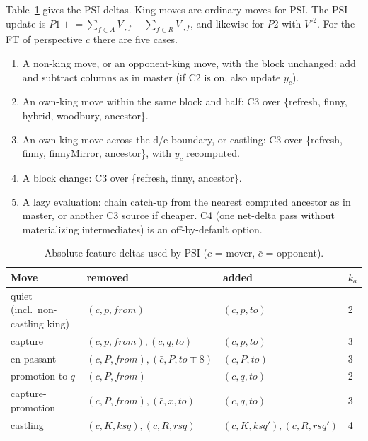 \documentclass[10pt]{article}
\theoremstyle{plain}
\theoremstyle{definition}
\begin{document}
Table~\ref{tab:moves} gives the PSI deltas.
King moves are ordinary moves for PSI.
The PSI update is $P1\mathrel{+}=\sum_{f\in A}V_{\cdot,f}-\sum_{f\in R}V_{\cdot,f}$, and likewise for $P2$ with $V^{\circ2}$.
For the FT of perspective $c$ there are five cases.
\begin{enumerate}[leftmargin=*,itemsep=1pt]
\item A non-king move, or an opponent-king move, with the block unchanged: add and subtract columns as in master (if C2 is on, also update $y_c$).
\item An own-king move within the same block and half: C3 over \{refresh, finny, hybrid, woodbury, ancestor\}.
\item An own-king move across the d/e boundary, or castling: C3 over \{refresh, finny, finnyMirror, ancestor\}, with $y_c$ recomputed.
\item A block change: C3 over \{refresh, finny, ancestor\}.
\item A lazy evaluation: chain catch-up from the nearest computed ancestor as in master, or another C3 source if cheaper. C4 (one net-delta pass without materializing intermediates) is an off-by-default option.
\end{enumerate}

\begin{table}[htbp]
\centering\small
\caption{Absolute-feature deltas used by PSI ($c$ = mover, $\bar c$ = opponent).}\label{tab:moves}
\begin{tabular}{@{}llll@{}}
\toprule
Move & removed & added & $k_a$\\
\midrule
quiet (incl.\ non-castling king) & $(c,p,\mathit{from})$ & $(c,p,\mathit{to})$ & 2\\
capture & $(c,p,\mathit{from}),(\bar c,q,\mathit{to})$ & $(c,p,\mathit{to})$ & 3\\
en passant & $(c,P,\mathit{from}),(\bar c,P,\mathit{to}\mp8)$ & $(c,P,\mathit{to})$ & 3\\
promotion to $q$ & $(c,P,\mathit{from})$ & $(c,q,\mathit{to})$ & 2\\
capture-promotion & $(c,P,\mathit{from}),(\bar c,x,\mathit{to})$ & $(c,q,\mathit{to})$ & 3\\
castling & $(c,K,\mathit{ksq}),(c,R,\mathit{rsq})$ & $(c,K,\mathit{ksq}'),(c,R,\mathit{rsq}')$ & 4\\
\bottomrule
\end{tabular}
\end{table}
\end{document}
